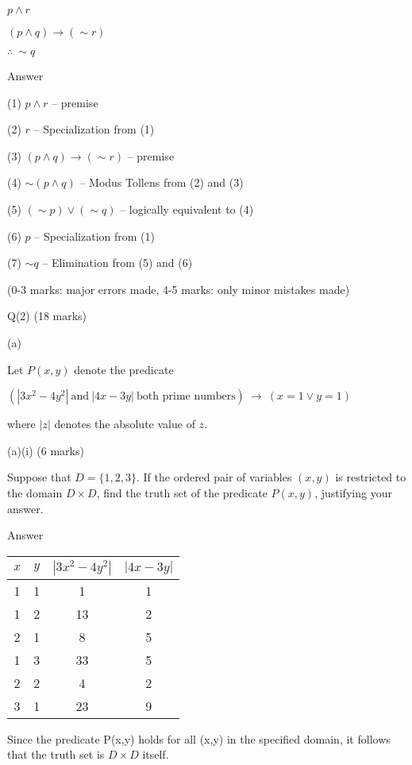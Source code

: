 \documentclass[a4paper,12pt,oneside]{book}
\theoremstyle{definition}
\begin{document}
$p \wedge r$

$(p \wedge q) \rightarrow (\sim r)$

$\therefore \ \sim q$

Answer

(1) $p \wedge r$ -- premise

(2) $r$ -- Specialization from (1)

(3) $(p \wedge q) \rightarrow (\sim r)$ -- premise

(4) $\sim (p \wedge q)$ -- Modus Tollens from (2) and (3)

(5) $(\sim p) \vee (\sim q)$ -- logically equivalent to (4)

(6) $p$ -- Specialization from (1)

(7) $\sim q$ -- Elimination from (5) and (6) 

(0-3 marks: major errors made, 4-5 marks: only minor mistakes made)


\newpage

Q(2) (18 marks)

(a)

Let $P(x,y)$ denote the predicate

$(|3x^2-4y^2| \ \text{and} \ |4x-3y| \ \text{both prime numbers}) \ \rightarrow \ (x=1 \vee y=1)$

where $|z|$ denotes the absolute value of $z$.

(a)(i) (6 marks)

Suppose that $D = \{ 1,2,3 \}$. If the ordered pair of variables $(x,y)$ is restricted to the domain $D \times D$, find the truth set of the predicate $P(x,y)$, justifying your answer.

Answer

\begin{center}
	\begin{tabular}{|c|c|c|c|}
		\hline
 		$x$ & $y$ & $|3x^2-4y^2|$ & $|4x-3y|$ \\
 		\hline
 		1 & 1 & 1 & 1 \\
 		\hline
 		1 & 2 & 13 & 2 \\
 		\hline
 		2 & 1 & 8 & 5 \\
 		\hline
 		1 & 3 & 33 & 5 \\
 		\hline
 		2 & 2 & 4 & 2 \\
 		\hline
 		3 & 1 & 23 & 9 \\
 		\hline  
	\end{tabular} 
\end{center}

Since the predicate P(x,y) holds for all (x,y) in the specified domain, it follows that the truth set is $D \times D$ itself.
\end{document}
